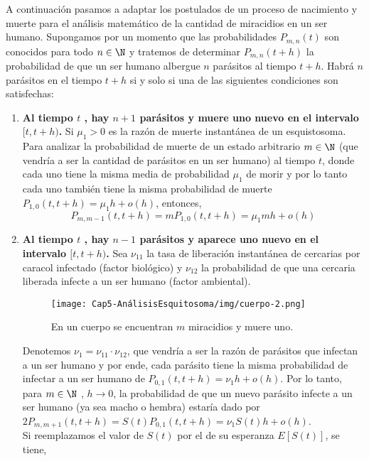     A continuación pasamos a adaptar los postulados de un proceso de nacimiento y muerte para el análisis matemático de la cantidad de miracidios en un ser humano.
    Supongamos por un momento que las probabilidades $P_{m,n}(t)$ son conocidos para todo $n \in \N$ 
    y tratemos de determinar $P_{m,n}(t+h)$ la probabilidad de que un ser humano albergue $n$ parásitos al tiempo $t+h$. Habrá $n$ parásitos en el tiempo $t+h$ si y solo si una de las siguientes condiciones son satisfechas:
    \begin{enumerate}
        \begin{figure}
          \label{cuerpo1}
            \centering
             \texttt{[image: Cap5-AnálisisEsquitosoma/img/cuerpo-1.png]}
            \caption{En un cuerpo se encuentran $m$ miracidios y muere uno.}
        \end{figure}
        \item 
        \textbf{Al tiempo $t$ , hay $n+1$ parásitos y muere uno nuevo en el intervalo $[t,t+h)$.} Si $\mu_1>0$ es la razón de muerte instantánea de un esquistosoma.\\
        Para analizar la probabilidad de muerte de un estado arbitrario $m\in \N$ (que vendría a ser la cantidad de parásitos en un ser humano) al tiempo $t$, donde cada uno tiene la misma media de probabilidad $\mu_1$ de morir y por lo tanto cada uno también tiene la misma probabilidad de muerte $P_{1,0}(t, t+h)=\mu_1 h + o(h)$, entonces, 
        $$P_{m ,m-1}(t,t+h)=mP_{1,0}(t,t+h)=\mu_1 mh+o(h)$$
         \item \textbf{Al tiempo $t$ , hay $n-1$ parásitos y aparece uno nuevo en el intervalo $[t,t+h)$.} Sea $\nu_{11}$ la tasa de liberación instantánea de cercarias por caracol infectado (factor biológico) y $\nu_{12}$ la probabilidad de que una cercaria liberada infecte a un ser humano (factor ambiental).\\
         \begin{figure}
         \label{cuerpo2}
            \centering
             \texttt{[image: Cap5-AnálisisEsquitosoma/img/cuerpo-2.png]}
            \caption{En un cuerpo se encuentran $m$ miracidios y muere uno.}
        \end{figure}
        Denotemos $\nu_1=\nu_{11}\cdot\nu_{12}$, que vendría a ser la razón de parásitos que infectan a un ser humano y por ende, cada parásito tiene la misma probabilidad de infectar a un ser humano de $P_{0,1}(t, t+h)=\nu_1 h + o(h).$ Por lo tanto, para $m\in\N$ , $h\rightarrow 0$, la probabilidad de que un nuevo parásito infecte a un ser humano (ya sea macho o hembra) estaría dado por  $2P_{m,m+1}(t,t+h)=S(t)P_{0,1}(t, t+h)=\nu_1S(t)h+o(h)$.\\Si reemplazamos el valor de $S(t)$ por el de su esperanza $E[S(t)]$, se tiene,

\end{enumerate}
